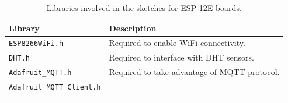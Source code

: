 \noindent\begin{minipage}{\textwidth}
\begingroup
\setlength{\LTleft}{-20cm plus -1fill}
\setlength{\LTright}{\LTleft}
	\begin{longtable}{l | l}
		\hline
		\textbf{Library} & \textbf{Description} \\
		\hline
		\hline
		\texttt{ESP8266WiFi.h} & Required to enable WiFi connectivity. \\
		\hline
		\texttt{DHT.h} & Required to interface with DHT sensors. \\
		\hline
		\texttt{Adafruit\_MQTT.h} & Required to take advantage of MQTT protocol. \\ 
		\texttt{Adafruit\_MQTT\_Client.h} &  \\
		\hline

	\caption{Libraries involved in the sketches for ESP-12E boards.}
	\label{esp12_code_libraries}
	\end{longtable}
\endgroup
\end{minipage}

